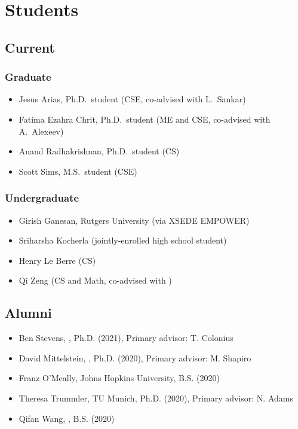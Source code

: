 \section{Students}

\subsection{Current}

\subsubsection{Graduate}

\begin{itemize}
    \item Jesus Arias, Ph.D.\ student (CSE, co-advised with L.\ Sankar)
    \item Fatima Ezahra Chrit, Ph.D.\ student (ME and CSE, co-advised with A.\ Alexeev)
    \item Anand Radhakrishnan, Ph.D.\ student (CS)
    \item Scott Sims, M.S.\ student (CSE)
\end{itemize}

\subsubsection{Undergraduate}

\begin{itemize}
    \item Girish Ganesan, Rutgers University (via XSEDE EMPOWER)
    \item Sriharsha Kocherla (jointly-enrolled high school student)
    \item Henry Le Berre (CS)
    \item Qi Zeng (CS and Math, co-advised with \Florian)
\end{itemize}

\subsection{Alumni}

\begin{itemize}
    \item Ben Stevens, \CIT, Ph.D. (2021), Primary advisor: T. Colonius
    \item David Mittelstein, \CIT, Ph.D. (2020), Primary advisor: M. Shapiro
    \item Franz O'Meally, Johns Hopkins University, B.S. (2020)
    \item Theresa Trummler, TU Munich, Ph.D. (2020), Primary advisor: N. Adams
    \item Qifan Wang, \CIT, B.S. (2020)
\end{itemize}

